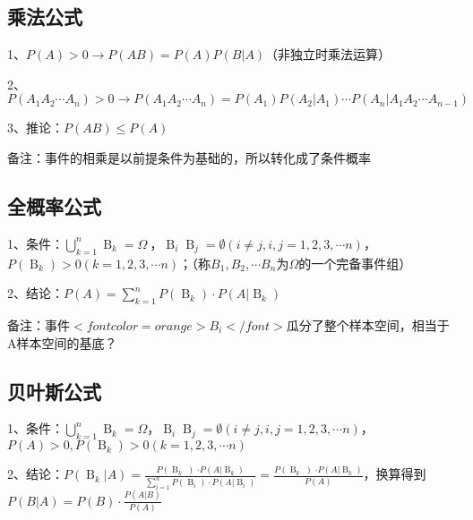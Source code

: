 \subsection{乘法公式}

1、$ P(A)>0 \rightarrow P(AB)=P(A)P(B|A) $（非独立时乘法运算）

2、$ P(A_1A_2\cdots A_n) > 0 \rightarrow P(A_1A_2\cdots A_n)=P(A_1)P(A_2|A_1)\cdots P(A_n|A_1A_2\cdots A_{n-1}) $

3、推论：$ P(AB) \le P(A) $

备注：事件的相乘是以前提条件为基础的，所以转化成了条件概率



\subsection{全概率公式}

1、条件：$ \mathop{ \bigcup }\limits_{{k=1}}^{{n}}\mathop{{B}}\nolimits_{{k}}=\Omega \  $，$ \mathop{{B}}\nolimits_{{i}}\mathop{{B}}\nolimits_{{j}}= \emptyset { \left( {i \neq j,i,j=1,2,3, \cdots n} \right) } $，$ P{ \left( {\mathop{{B}}\nolimits_{{k}}} \right) } > 0{ \left( {k=1,2,3, \cdots n} \right) } $；（称$ B_1,B_2,\cdots B_n $为$ \Omega $的一个完备事件组）

2、结论：$ P{ \left( {A} \right) }=\mathop{ \sum }\limits_{{k=1}}^{{n}}P{ \left( {\mathop{{B}}\nolimits_{{k}}} \right) } \cdot P{ \left( {A \left| \mathop{{B}}\nolimits_{{k}}\right. } \right) } $

备注：事件$ <font color=orange>B_i</font> $瓜分了整个样本空间，相当于A样本空间的基底？



\subsection{贝叶斯公式}

1、条件：$ \mathop{ \bigcup }\limits_{{k=1}}^{{n}}\mathop{{B}}\nolimits_{{k}}=\Omega $，$ \mathop{{B}}\nolimits_{{i}}\mathop{{B}}\nolimits_{{j}}= \emptyset { \left( {i \neq j,i,j=1,2,3, \cdots n} \right) } $，$ P(A) > 0,P{ \left( {\mathop{{B}}\nolimits_{{k}}} \right) } > 0{ \left( {k=1,2,3, \cdots n} \right) } $

2、结论：$ P{ \left( {\mathop{{B}}\nolimits_{{k}} \left| A\right. } \right) }=\frac{{P \left( {\mathop{{B}}\nolimits_{{k}}} \left) \cdot P{ \left( {A \left| {\mathop{{B}}\nolimits_{{k}}}\right. } \right) }\right. \right. }}{{\mathop{ \sum }\limits_{{i=1}}^{{n}}P{ \left( {\mathop{{B}}\nolimits_{{i}}} \right) } \cdot P{ \left( {A \left| \mathop{{B}}\nolimits_{{i}}\right. } \right) }}}=\frac{{P \left( {\mathop{{B}}\nolimits_{{k}}} \left) \cdot P{ \left( {A \left| {\mathop{{B}}\nolimits_{{k}}}\right. } \right) }\right. \right. }}{P(A)} $，换算得到$ P(B|A)=P(B)\cdot \frac{P(A|B)}{P(A)} $

